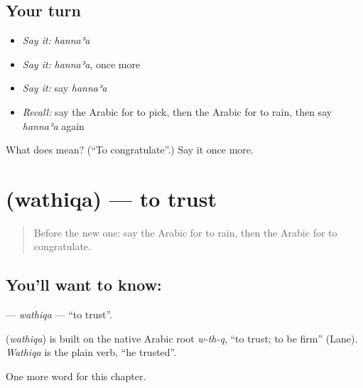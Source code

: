 \subsection*{Your turn}
\begin{itemize}
\raggedright
  \item \emph{Say it:} \emph{hannaʾa}
  \item \emph{Say it:} \emph{hannaʾa}, once more
  \item \emph{Say it:} say \emph{hannaʾa}
  \item \emph{Recall:} say the Arabic for to pick, then the Arabic for to rain, then say \emph{hannaʾa} again
\end{itemize}

\begin{tcolorbox}[breakable,colback=teal!4,colframe=teal!35!black,title={Before you move on}]
What does  mean? (\textquotedblleft{}To congratulate\textquotedblright{}.) Say it once more.
\end{tcolorbox}
\section[\texorpdfstring{\ar{وثق} (wathiqa)}{وثق (wathiqa)}]{ (wathiqa) — to trust}

\label{lesson:AR-C196-wathiqa2}



\begin{quote}
Before the new one: say the Arabic for to rain, then the Arabic for to congratulate.
\end{quote}

\subsection*{You'll want to know: }
\textbf{} — \emph{wathiqa} — \textquotedblleft{}to trust\textquotedblright{}.

\begin{cousinweb}
\textbf{} (\emph{wathiqa}) is built on the native Arabic root \emph{w-th-q}, \textquotedblleft{}to trust; to be firm\textquotedblright{} (Lane). \emph{Wathiqa} is the plain verb, \textquotedblleft{}he trusted\textquotedblright{}.
\end{cousinweb}

\begin{grammarlens}[title={What you've built}]
One more word for this chapter.
\end{grammarlens}

